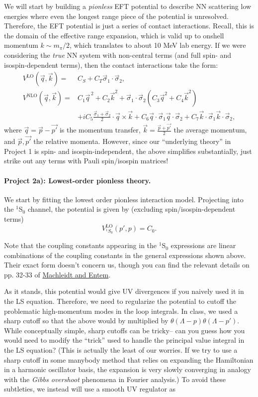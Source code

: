 \documentclass[%
oneside,                 %
final,                   %
10pt]{article}
\begin{document}
We will start by building a \emph{pionless} EFT potential to describe
NN scattering low energies where even the longest range piece of the
potential is unresolved.  Therefore, the EFT potential is just a
series of contact interactions. Recall, this is the domain of the
effective range expansion, which is valid up to onshell momentum
$k\sim m_{\pi}/2$, which translates to about 10 MeV lab energy. If we
were considering the \emph{true} NN system with non-central terms (and full
spin- and isospin-dependent terms), then the contact interactions take
the form: 
\begin{align*}
V^\mathrm{LO}(\vec{q},\vec{k})=&C_S+C_T\vec{\sigma}_1\cdot\vec{\sigma}_2,\\
V^\mathrm{NLO}(\vec{q},\vec{k})=&C_1\vec{q}^{\,2}+C_2\vec{k}^2+
\vec{\sigma}_1\cdot\vec{\sigma}_2\left(C_3\vec{q}^2+C_4\vec{k}^2\right)\\
&+iC_5\frac{\vec{\sigma}_1+\vec{\sigma}_2}{2}\cdot\vec{q}\times\vec{k}+C_6\vec{q}\cdot\vec{\sigma}_1\vec{q}\cdot\vec{\sigma}_2
+C_7\vec{k}\cdot\vec{\sigma}_1\vec{k}\cdot\vec{\sigma}_2, 
\end{align*}
where $\vec{q}=\vec{p}-\vec{p'}$ is the momentum transfer,
$\vec{k}=\frac{\vec{p}+\vec{p'}}{2}$ the average momentum, and
$\vec{p},\vec{p'}$ the relative momenta.  However, since our
``underlying theory'' in Project 1 is spin- and isospin-independent,
the above simplifies substantially, just strike out any terms with
Pauli spin/isospin matrices!




\paragraph{Project 2a): Lowest-order pionless theory.}
We start by fitting the lowest order pionless interaction model. Projecting into the $^1$S$_0$ channel, the potential is given by (excluding spin/isospin-dependent terms)
\[
V^\mathrm{LO}_{^1S_0}(p',p)=C_0.
\]

Note that the coupling constants appearing in the $^1$S$_0$
expressions are linear combinations of the coupling constants in the
general expressions shown above. Their exact form doesn't concern us,
though you can find the relevant details on pp. 32-33 of \href{{https://arxiv.org/abs/1105.2919}}{Machleidt and Entem}.

As it stands, this potential would give UV
divergences if you naively used it in the LS equation. Therefore, we
need to regularize the potential to cutoff the problematic
high-momentum modes in the loop integrals. In class, we used a sharp
cutoff so that the above would by multiplied by $\theta(\Lambda -
p)\theta(\Lambda-p')$. While conceptually simple, sharp cutoffs can be
tricky-- can you guess how you would need to modify the ``trick'' used
to handle the principal value integral in the LS equation? (This is
actually the least of our worries. If we try to use a sharp cutoff in
some manybody method that relies on expanding the Hamiltonian in a
harmonic oscillator basis, the expansion is very slowly converging in
analogy with the \emph{Gibbs overshoot} phenomena in Fourier analysis.) To
avoid these subtleties, we instead will use a smooth UV regulator as
\end{document}
